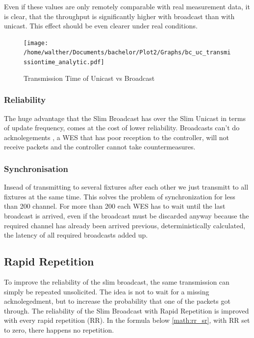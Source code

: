 Even if these values are only remotely comparable with real measurement data, it is clear,
that the throughput is significantly higher with broadcast than with unicast.
This effect should be even clearer under real conditions.

\begin{figure}[h]
	\centering
	\texttt{[image: /home/walther/Documents/bachelor/Plot2/Graphs/bc\_uc\_transmissiontime\_analytic.pdf]}
	\caption{Transmission Time of Unicast vs Broadcast}
	\label{fig:bc_uc_transmissiontime_analytic}
\end{figure}

\subsubsection*{Reliability}

The huge advantage that the Slim Broadcast has over the Slim Unicast in terms of update frequency,
comes at the cost of lower reliability.
Broadcasts can't do acknolegements , 
a WES that has poor reception to the controller, will not receive packets and the controller cannot take countermeasures.

\subsubsection*{Synchronisation}
Insead of transmitting to several fixtures after each other we just transmitt to all fixtures at the same time.
This solves the problem of synchronization for less than 200 channel.
For more than 200 each WES has to wait until the last broadcast is arrived, 
even if the broadcast must be discarded anyway because the required channel has already been arrived previous,
deterministically calculated, the latency of all required broadcasts added up.

\subsection{Rapid Repetition}


To improve the reliability of the slim broadcast, the same transmission can simply be repeated unsolicited.
The idea is not to wait for a missing acknolegedment, but to increase the probability that one of the packets got through.
The reliability of the Slim Broadcast with Rapid Repetition is improved with every rapid repetition (RR).
In the formula below \cref{math:rr_sr}, with RR set to zero, there happens no repetition.

